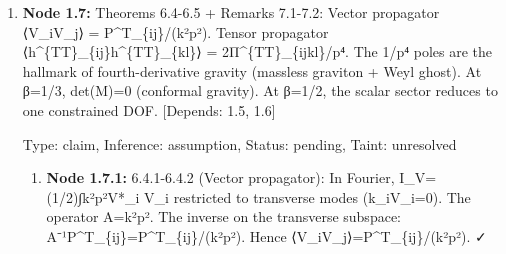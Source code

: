 \documentclass{article}
\begin{document}
\begin{enumerate}
\begin{enumerate}
  Type: claim, Inference: assumption, Status: pending, Taint: unresolved

\item \textbf{Node 1.6.2:} 6.1.4-6.1.5: Subtracting M\_\{11\}M\_\{22\}-M\_\{12\}²: k⁸ terms cancel; k⁶p² terms cancel (both 16(1-2β)(1-3β)); k⁴p⁴ terms give [24(1-2β)(1-3β)-16(1-3β)²]k⁴p⁴ = 8(1-3β)[3(1-2β)-2(1-3β)]k⁴p⁴ = 8(1-3β)·1·k⁴p⁴. Hence det(M)=8(1-3β)k⁴p⁴. [Verified by SymPy test\_determinant.py] ✓

  Type: claim, Inference: assumption, Status: pending, Taint: unresolved

\item \textbf{Node 1.6.3:} 6.3.1 (Normalization): Action I\_S=∫Φ*\_a M\_\{ab\} Φ\_b over all k. For real fields Φ\_a(-k)=Φ*\_a(k), so canonical form is (1/2)∫Φ(-k)A(k)Φ(k) with A=2M. Propagator G=A⁻¹=(1/2)M⁻¹. Consistency: tensor gives G=2/p⁴ ✓, vector gives G=1/(k²p²) ✓.

  Type: claim, Inference: assumption, Status: pending, Taint: unresolved

\item \textbf{Node 1.6.4:} 6.3.4-6.3.7: (1/2)M⁻¹ = (1/(2detM))[[M\_\{22\},-M\_\{12\}],[-M\_\{12\},M\_\{11\}]]. ⟨ψψ⟩=M\_\{11\}/(2detM)=(1-2β)/(8(1-3β)p⁴). ⟨Φψ⟩=-M\_\{12\}/(2detM)=-1/(4k²p²)-(1-2β)/(8(1-3β)p⁴). ⟨ΦΦ⟩=M\_\{22\}/(2detM)=3/(4k⁴)+1/(2k²p²)+(1-2β)/(8(1-3β)p⁴). [Verified by SymPy test\_matrix\_inverse.py] ✓ QED.

  Type: claim, Inference: assumption, Status: pending, Taint: unresolved

\end{enumerate}
\item \textbf{Node 1.7:} Theorems 6.4-6.5 + Remarks 7.1-7.2: Vector propagator ⟨V\_iV\_j⟩ = P\textasciicircum{}T\_\{ij\}/(k²p²). Tensor propagator ⟨h\textasciicircum{}\{TT\}\_\{ij\}h\textasciicircum{}\{TT\}\_\{kl\}⟩ = 2Π\textasciicircum{}\{TT\}\_\{ijkl\}/p⁴. The 1/p⁴ poles are the hallmark of fourth-derivative gravity (massless graviton + Weyl ghost). At β=1/3, det(M)=0 (conformal gravity). At β=1/2, the scalar sector reduces to one constrained DOF. [Depends: 1.5, 1.6]

  Type: claim, Inference: assumption, Status: pending, Taint: unresolved

\begin{enumerate}
\item \textbf{Node 1.7.1:} 6.4.1-6.4.2 (Vector propagator): In Fourier, I\_V=(1/2)∫k²p²V*\_i V\_i restricted to transverse modes (k\_iV\_i=0). The operator A=k²p². The inverse on the transverse subspace: A⁻¹P\textasciicircum{}T\_\{ij\}=P\textasciicircum{}T\_\{ij\}/(k²p²). Hence ⟨V\_iV\_j⟩=P\textasciicircum{}T\_\{ij\}/(k²p²). ✓


\end{enumerate}
\end{enumerate}
\end{document}

